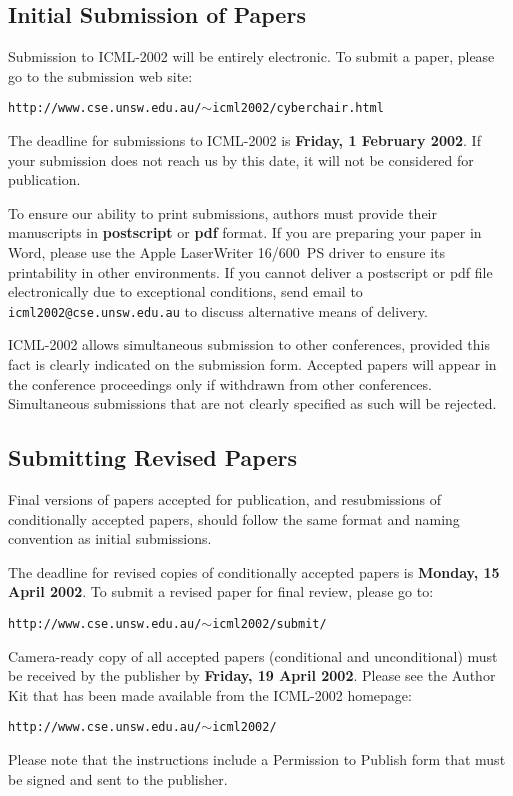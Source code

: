 \subsection{Initial Submission of Papers}

Submission to ICML-2002 will be entirely electronic.  To submit a paper,
please go to the submission web site:
\vskip 0.1in
\begin{small}
\centerline{{\tt http://www.cse.unsw.edu.au/$\mathtt{\sim}$icml2002/cyberchair.html}}
\end{small}

The deadline for submissions to ICML-2002 is {\bf Friday, 1 February
2002}. If your submission does not reach us by this date, it will not
be considered for publication.

To ensure our ability to print submissions, authors must provide their
manuscripts in {\bf postscript} or {\bf pdf} format. If you are preparing
your paper in Word, please use the Apple LaserWriter 16/600~PS driver to
ensure its printability in other environments. If you cannot deliver a 
postscript or pdf file electronically due to exceptional conditions, send
email to {\tt icml2002@cse.unsw.edu.au} to discuss alternative
means of delivery.

ICML-2002 allows simultaneous submission to other conferences, provided 
this fact is clearly indicated on the submission form. Accepted papers 
will appear in the conference proceedings only if withdrawn from other
conferences. Simultaneous submissions that are not clearly specified
as such will be rejected.

\subsection{Submitting Revised Papers}

Final versions of papers accepted for publication, and resubmissions 
of conditionally accepted papers, should follow the same format and
naming convention as initial submissions.

The deadline for revised copies of conditionally accepted papers is
{\bf Monday, 15 April 2002}.  To submit a revised paper for final
review, please go to:
\vskip 0.1in
\begin{small}
\centerline{{\tt http://www.cse.unsw.edu.au/$\mathtt{\sim}$icml2002/submit/}}
\end{small}

Camera-ready copy of all accepted papers (conditional and unconditional)
must be received by the publisher by {\bf Friday, 19 April 2002}. Please
see the Author Kit that has been made available from the ICML-2002 homepage:
\vskip 0.1in
\begin{small}
\centerline{{\tt http://www.cse.unsw.edu.au/$\mathtt{\sim}$icml2002/}}
\end{small}
Please note that the instructions include a Permission to Publish form
that must be signed and sent to the publisher.

